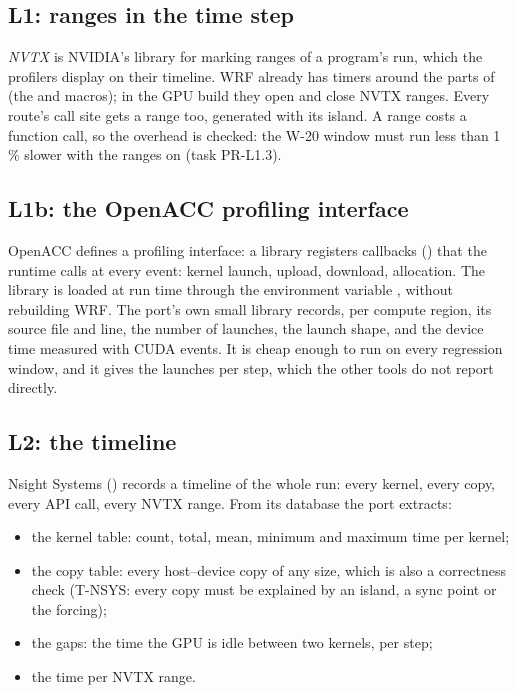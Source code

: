 \subsection{L1: ranges in the time step}

\emph{NVTX} is NVIDIA's library for marking ranges of a program's run, which the profilers display on their
timeline. WRF already has timers around the parts of  (the  and 
macros); in the GPU build they open and close NVTX ranges. Every route's call site gets a range too, generated with
its island. A range costs a function call, so the overhead is checked: the W-20 window must run less than 1\,\% slower
with the ranges on (task PR-L1.3).

\subsection{L1b: the OpenACC profiling interface}

OpenACC defines a profiling interface: a library registers callbacks () that the runtime
calls at every event: kernel launch, upload, download, allocation. The library is loaded at run time through the
environment variable , without rebuilding WRF. The port's own small library records, per compute
region, its source file and line, the number of launches, the launch shape, and the device time measured with CUDA
events. It is cheap enough to run on every regression window, and it gives the launches per step, which the other
tools do not report directly.

\subsection{L2: the timeline}

Nsight Systems () records a timeline of the whole run: every kernel, every copy, every API call, every NVTX
range. From its database the port extracts:
\begin{itemize}
  \item the kernel table: count, total, mean, minimum and maximum time per kernel;
  \item the copy table: every host--device copy of any size, which is also a correctness check (T-NSYS: every copy
    must be explained by an island, a sync point or the forcing);
  \item the gaps: the time the GPU is idle between two kernels, per step;
  \item the time per NVTX range.
\end{itemize}

